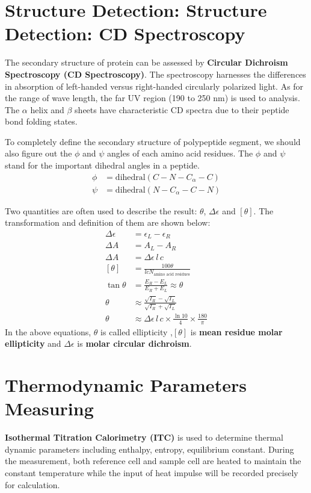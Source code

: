 \documentclass{report}
\begin{document}
\section{Structure Detection: Structure Detection: CD Spectroscopy}
The secondary structure of protein can be assessed by \textbf{Circular Dichroism Spectroscopy (CD Spectroscopy)}.
The spectroscopy harnesses the differences in absorption of left-handed versus right-handed circularly polarized light.
As for the range of wave length, the far UV region (190 to 250 nm) is used to analysis.
The $\alpha$ helix and $\beta$ sheets have characteristic CD spectra due to their peptide bond folding states.

To completely define the secondary structure of polypeptide segment, we should also figure out the $\phi$ and $\psi$ angles of each amino acid residues.
The $\phi$ and $\psi$ stand for the important dihedral angles in a peptide.
\begin{align}
    \phi &= \text{dihedral}(C-N-C_{\alpha}-C)\\
    \psi &= \text{dihedral}(N-C_{\alpha}-C-N)
\end{align}

Two quantities are often used to describe the result: $\theta$, $\Delta \epsilon$ and $[\theta]$.
The transformation and definition of them are shown below:
\begin{align}
    \Delta \epsilon &= \epsilon_{L}-\epsilon_{R}\\
    \Delta A &= A_{L}-A_{R}\\
    \Delta A &= \Delta \epsilon \, l \, c\\
    [\theta] &= \frac{100\theta}{lcN_{\text{amino acid residues}}}\\
    \tan \theta &= \frac{E_{R} - E_{L}}{E_{R} + E_{L}} \approx \theta\\
    \theta &\approx \frac{\sqrt{I_{R}} - \sqrt{I_{L}}}{\sqrt{I_{R}} + \sqrt{I_{L}}}\\
    \theta &\approx \Delta \epsilon \, l \, c \times \frac{\ln 10}{4} \times \frac{180}{\pi}
\end{align}
In the above equations, $\theta$ is called ellipticity ,$[\theta]$ is \textbf{mean residue molar ellipticity} and $\Delta \epsilon$ is \textbf{molar circular dichroism}.
\section{Thermodynamic Parameters Measuring}
\textbf{Isothermal Titration Calorimetry (ITC)} is used to determine thermal dynamic parameters including enthalpy, entropy, equilibrium constant.
During the measurement, both reference cell and sample cell are heated to maintain the constant temperature while the input of heat impulse will be recorded precisely for calculation.
\end{document}
